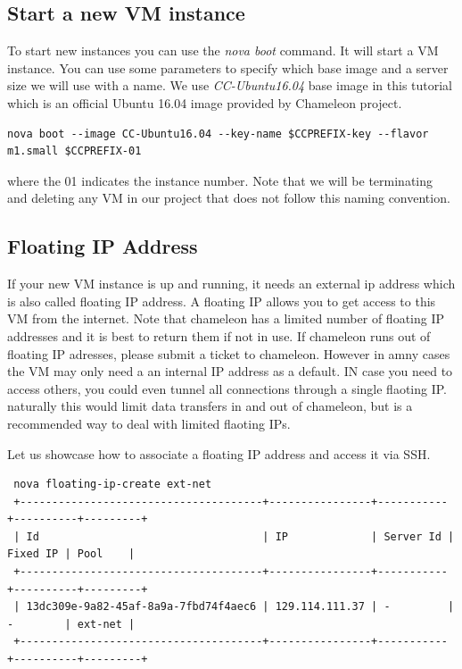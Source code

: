 \subsection{Start a new VM instance}

To start new instances you can use the \textit{nova boot} command. It
will start a VM instance. You can use some parameters to specify which
base image and a server size we will use with a name. We use
\textit{CC-Ubuntu16.04} base image in this tutorial which is an
official Ubuntu 16.04 image provided by Chameleon project.

\begin{lstlisting}
nova boot --image CC-Ubuntu16.04 --key-name $CCPREFIX-key --flavor m1.small $CCPREFIX-01
\end{lstlisting}

where the 01 indicates the instance number. Note that we will be
terminating and deleting any VM in our project that does not follow
this naming convention.

\subsection{Floating IP Address}

If your new VM instance is up and running, it needs an external ip
address which is also called floating IP address. A floating IP allows
you to get access to this VM from the internet. Note that chameleon
has a limited number of floating IP addresses and it is best to return
them if not in use. If chameleon runs out of floating IP adresses,
please submit a ticket to chameleon.
However in amny cases the VM may only need a an internal IP address as a
default. IN case you need to access others, you could even tunnel all
connections through a single flaoting IP. naturally this would limit
data transfers in and out of chameleon, but is a recommended way to
deal with limited flaoting IPs.

Let us showcase how to associate a floating IP address and access it
via SSH.

\begin{tiny}
\begin{lstlisting}
 nova floating-ip-create ext-net
 +--------------------------------------+----------------+-----------+----------+---------+
 | Id                                   | IP             | Server Id | Fixed IP | Pool    |
 +--------------------------------------+----------------+-----------+----------+---------+
 | 13dc309e-9a82-45af-8a9a-7fbd74f4aec6 | 129.114.111.37 | -         | -        | ext-net |
 +--------------------------------------+----------------+-----------+----------+---------+
\end{lstlisting}
\end{tiny}

